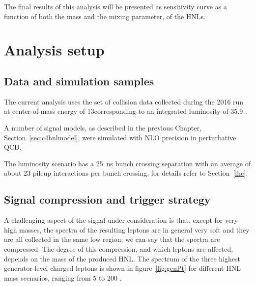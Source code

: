 The final results of this analysis will be presented as sensitivity
curve as a function of both the mass and the mixing parameter, \mixpar
of the HNLs. 

\section{Analysis setup}
\subsection{Data and simulation samples}
The current analysis uses the set of \Pp collision data collected during the 2016 run at center-of-mass energy of 13\TeV corresponding to
an integrated luminosity of 35.9 \fbinv. 

A number of signal models, as described in the previous
Chapter, Section~\ref{sec:c4hnlmodel}, were simulated with NLO precision in
perturbative QCD. 

The luminosity scenario has a 25~ns bunch crossing separation with an
average of about 23 pileup interactions per bunch
crossing, for details refer to Section~\ref{lhc}.

\subsection{Signal compression and trigger strategy}\label{sec:compression}
A challenging aspect of the signal under consideration is that, except
for very high masses, the \pt
spectra of the resulting leptons are in general very soft and they are
all collected in the same low \pt region; we can say that the \pt
spectra are compressed. The degree of this compression, and which
leptons are affected, depends on the mass of the produced HNL. The \pt
spectrum of the three highest \pt generator-level charged leptons is shown in figure~\ref{fig:genPt} for different HNL mass scenarios, ranging from 5 to 200 \GeV . 

